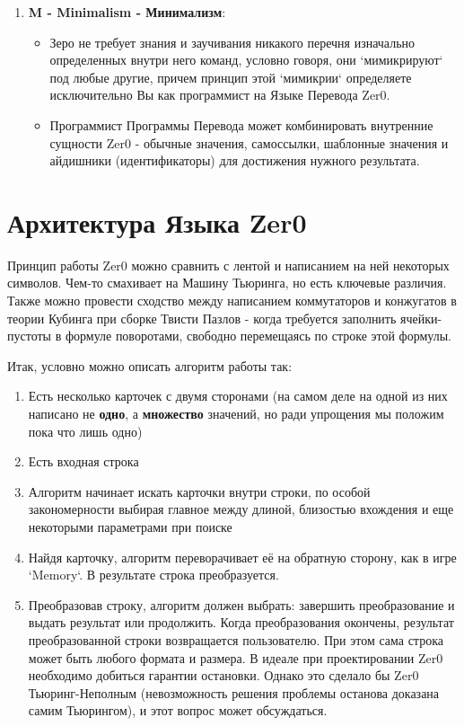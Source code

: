 \documentclass{book}
\begin{document}
\begin{enumerate}
\item \textbf{M - Minimalism - Минимализм}:

\begin{itemize}
\item Зеро не требует знания и заучивания никакого перечня изначально определенных внутри него команд, условно говоря, они `мимикрируют` под любые другие, причем принцип этой `мимикрии` определяете исключительно Вы как программист на Языке Перевода Zer0.
\item Программист Программы Перевода может комбинировать внутренние сущности Zer0 - обычные значения, самоссылки, шаблонные значения и айдишники (идентификаторы) для достижения нужного результата.
\end{itemize}

\end{enumerate}

\newpage

\chapter{Архитектура Языка Zer0}

Принцип работы Zer0 можно сравнить с лентой и написанием на ней некоторых символов. Чем-то смахивает на Машину Тьюринга, но есть ключевые различия. Также можно провести сходство между написанием коммутаторов и конжугатов в теории Кубинга при сборке Твисти Пазлов - когда требуется заполнить ячейки-пустоты в формуле поворотами, свободно перемещаясь по строке этой формулы.

Итак, условно можно описать алгоритм работы так:

\begin{enumerate}

\item Есть несколько карточек с двумя сторонами (на самом деле на одной из них написано не \textbf{одно}, а \textbf{множество} значений, но ради упрощения мы положим пока что лишь одно)

\item Есть входная строка

\item Алгоритм начинает искать карточки внутри строки, по особой закономерности выбирая главное между длиной, близостью вхождения и еще некоторыми параметрами при поиске

\item Найдя карточку, алгоритм переворачивает её на обратную сторону, как в игре `Memory`. В результате строка преобразуется.

\item Преобразовав строку, алгоритм должен выбрать: завершить преобразование и выдать результат или продолжить. Когда преобразования окончены, результат преобразованной строки возвращается пользователю. При этом сама строка может быть любого формата и размера. В идеале при проектировании Zer0 необходимо добиться гарантии остановки. Однако это сделало бы Zer0 Тьюринг-Неполным (невозможность решения проблемы останова доказана самим Тьюрингом), и этот вопрос может обсуждаться.

\end{enumerate}
\end{document}
